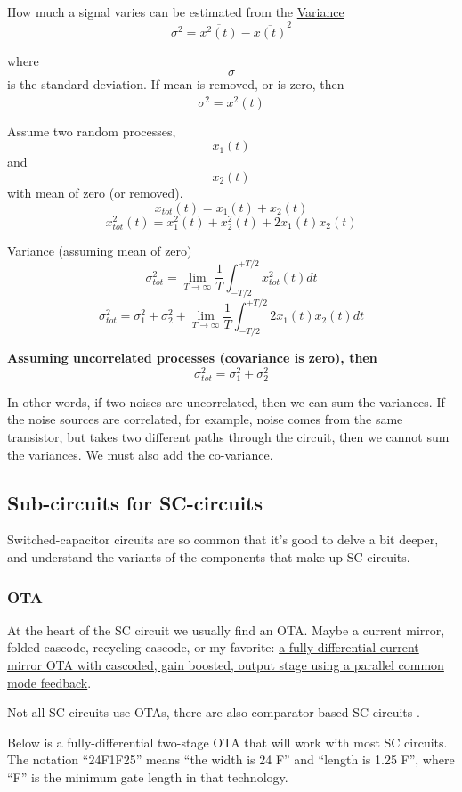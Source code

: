 How much a signal varies can be estimated from the
\href{https://en.wikipedia.org/wiki/Variance}{Variance}
\[ \sigma^2 = \overline{x^2(t)} - \overline{x(t)}^2\]

where \[\sigma\] is the standard deviation. If mean is removed, or is
zero, then \[ \sigma^2 = \overline{x^2(t)} \]

Assume two random processes, \[x_1(t)\] and \[x_2(t)\] with mean of zero
(or removed). \[ x_{tot}(t) =  x_1(t) + x_2(t)\]
\[ x_{tot}^2(t) = x_1^2(t) + x_2^2(t) + 2x_1(t)x_2(t)\]

Variance (assuming mean of zero)
\[ \sigma^2_{tot} = \lim_{T\to\infty} \frac{1}{T}\int^{+T/2}_{-T/2}{ x_{tot}^2(t) dt} \]
\[ \sigma^2_{tot} = \sigma_1^2 + \sigma_2^2 + \lim_{T\to\infty} \frac{1}{T}\int^{+T/2}_{-T/2}{ 2x_1(t)x_2(t) dt} \]

\textbf{Assuming uncorrelated processes (covariance is zero), then
\[ \sigma^2_{tot} = \sigma_1^2 + \sigma_2^2  \]}

In other words, if two noises are uncorrelated, then we can sum the
variances. If the noise sources are correlated, for example, noise comes
from the same transistor, but takes two different paths through the
circuit, then we cannot sum the variances. We must also add the
co-variance.

\subsection{Sub-circuits for
SC-circuits}\label{sub-circuits-for-sc-circuits}

Switched-capacitor circuits are so common that it's good to delve a bit
deeper, and understand the variants of the components that make up SC
circuits.

\subsubsection{OTA}\label{ota}

At the heart of the SC circuit we usually find an OTA. Maybe a current
mirror, folded cascode, recycling cascode, or my favorite:
\href{https://github.com/wulffern/cnr_ota_sky130nm/tree/main}{a fully
differential current mirror OTA with cascoded, gain boosted, output
stage using a parallel common mode feedback}.

Not all SC circuits use OTAs, there are also comparator based SC
circuits .

Below is a fully-differential two-stage OTA that will work with most SC
circuits. The notation ``24F1F25'' means ``the width is 24 F'' and
``length is 1.25 F'', where ``F'' is the minimum gate length in that
technology.


